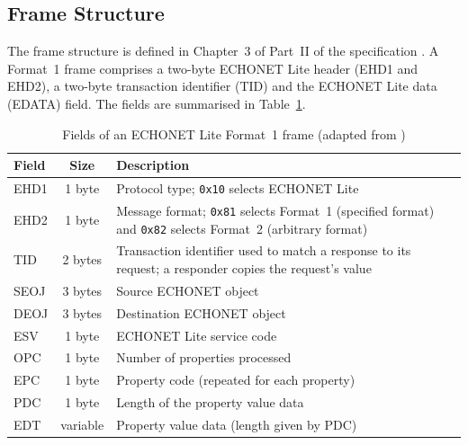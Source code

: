 \subsection{Frame Structure}
\label{sec:echonet-frame}

The frame structure is defined in Chapter~3 of Part~II of the specification \cite{ECHONETPart2}. A Format~1 frame comprises a two-byte ECHONET Lite header (EHD1 and EHD2), a two-byte transaction identifier (TID) and the ECHONET Lite data (EDATA) field. The fields are summarised in Table~\ref{tab:echonet-frame}.

\begin{table}[htbp]
  \centering
  \caption{Fields of an ECHONET Lite Format~1 frame (adapted from \cite{ECHONETPart2})}
  \label{tab:echonet-frame}
  \renewcommand{\arraystretch}{1.2}
  \begin{tabularx}{\textwidth}{@{}l c X@{}}
    \toprule
    \textbf{Field} & \textbf{Size} & \textbf{Description}                                                                                                    \\
    \midrule
    EHD1           & 1 byte        & Protocol type; \texttt{0x10} selects ECHONET Lite                                                                       \\
    EHD2           & 1 byte        & Message format; \texttt{0x81} selects Format~1 (specified format) and \texttt{0x82} selects Format~2 (arbitrary format) \\
    TID            & 2 bytes       & Transaction identifier used to match a response to its request; a responder copies the request's value                  \\
    SEOJ           & 3 bytes       & Source ECHONET object                                                                                                   \\
    DEOJ           & 3 bytes       & Destination ECHONET object                                                                                              \\
    ESV            & 1 byte        & ECHONET Lite service code                                                                                               \\
    OPC            & 1 byte        & Number of properties processed                                                                                          \\
    EPC            & 1 byte        & Property code (repeated for each property)                                                                              \\
    PDC            & 1 byte        & Length of the property value data                                                                                       \\
    EDT            & variable      & Property value data (length given by PDC)                                                                               \\
    \bottomrule
  \end{tabularx}
\end{table}

